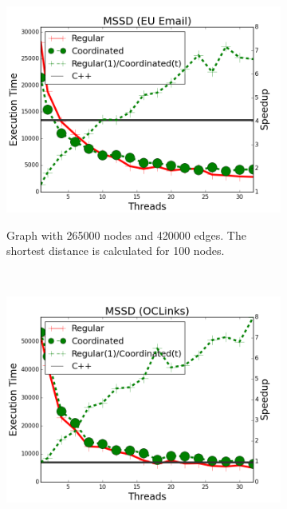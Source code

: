 
\begin{figure}[]
        \centering
        \begin{subfigure}[b]{\plotsize\textwidth}
                \includegraphics[width=\textwidth]{experiments/coordination/unbuffered-shortest-email.png}
                \label{fig:coordination:coord_unbuffered_sssp_email}
                \caption{Graph with 265000 nodes and 420000 edges. The shortest
                distance is calculated for 100 nodes.}
        \end{subfigure}
        ~
        \begin{subfigure}[b]{\plotsize\textwidth}
                \includegraphics[width=\textwidth]{experiments/coordination/unbuffered-shortest-oclinks.png}

\end{subfigure}
\end{figure}
